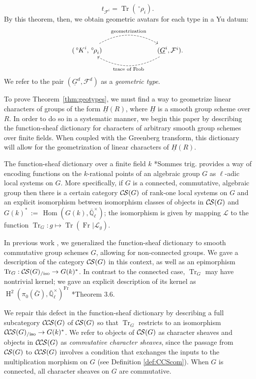 \documentclass[10pt]{amsart}
\theoremstyle{plain}
\theoremstyle{definition}
\newcommand{\EE}{\mathbb{\bar Q}_\ell}
\newcommand{\EEx}{\EE^\times}
\newcommand{\Frob}[1]{\operatorname{Fr}_{#1}}
\DeclareMathOperator{\Hom}{Hom}
\DeclareMathOperator{\Hh}{H}
\DeclareMathOperator{\trace}{Tr}
\newcommand{\ceq}{{\, :=\, }}
\newcommand{\trFrob}[1]{t_{#1}}
\DeclareMathOperator{\Tr}{Tr}
\newcommand{\TrFrob}[1]{\Tr_{#1}}
\newcommand{\cs}[1]{{\mathcal{#1}}}
\newcommand{\CS}{{\mathcal{C\hskip-0.8pt S}}}
\newcommand{\CCS}{{\mathcal{C\hskip-.8pt C\hskip-0.8pt S}}}
\newcommand{\CSiso}[1]{\CS(#1)_{/\text{iso}}}
\newcommand{\CCSiso}[1]{\CCS(#1)_{/\text{iso}}}
\newcommand{\bG}{\bar{G}}
\newcommand{\oK}{{\,^\circ \hskip-1pt K}}
\newcommand{\orho}{{\,^\circ \hskip-1pt \rho}}
\begin{document}
\begin{equation}\label{eqn:intro1}
\trFrob{\cs{F}^i} = \trace(\,^\circ\rho_i).
\end{equation}
By this theorem, then, we obtain geometric avatars for each type in a Yu datum:
\[
\begin{tikzcd}
(\oK^i,\orho_i) \arrow[bend left, dashed]{rrr}{\text{geometrization}} &&& \arrow[bend left, dashed]{lll}{\text{trace of Frob}}
(\underline{G}^i, \cs{F}^i).
\end{tikzcd}
\]
We refer to the pair $(\underline{G}^d, \cs{F}^d)$ as a \emph{geometric type}.

To prove Theorem~\ref{thm:geotypes}, we must find a way to geometrize linear characters of groups of the form $\underline{H}(R)$, where $\underline{H}$ is a smooth group scheme over $R$. 
In order to do so in a systematic manner, we begin this paper by describing the function-sheaf dictionary for characters of arbitrary smooth group schemes over finite fields. 
When coupled with the Greenberg transform, this dictionary will allow for the geometrization of linear characters of $\underline{H}(R)$.

The function-sheaf dictionary over a finite field $k$ \cite{deligne:SGA4.5}*{Sommes trig.}
provides a way of encoding functions on the $k$-rational points of an algebraic group $G$
as $\ell$-adic local systems on $G$.  More specifically, if $G$ is a connected, commutative, algebraic group
then there is a certain category $\CS(G)$ of rank-one local systems on $G$ and an
explicit isomorphism between isomorphism classes
of objects in $\CS(G)$ and $G(k)^* \ceq \Hom(G(k), \EEx)$; 
the isomorphism is given by mapping $\cs{L}$ to the function
$\TrFrob{G} : g \mapsto \Tr(\Frob{} \vert \cs{L}_g)$.

In previous work \cite{cunningham-roe:13a}, we generalized the function-sheaf dictionary to
smooth commutative group schemes $G$, allowing for non-connected groups.
We gave a description of the category $\CS(G)$ in this context, as well
as an epimorphism $\TrFrob{G} : \CSiso{G} \to G(k)^*$.
In contrast to the connected case, $\TrFrob{G}$ may have nontrivial kernel;
we gave an explicit description of its kernel as $\Hh^2(\pi_0(\bG), \EEx)^{\Frob{}}$ \cite{cunningham-roe:13a}*{Theorem 3.6}.  

We repair this defect in the function-sheaf dictionary
 by describing a full subcategory $\CCS(G)$ of $\CS(G)$ so that $\TrFrob{G}$ restricts to an isomorphism $\CCSiso{G} \to G(k)^*$.
We refer to objects of $\CS(G)$ as character sheaves and objects in $\CCS(G)$ as \emph{commutative character sheaves}, since the passage from $\CS(G)$ to $\CCS(G)$ involves a condition that exchanges the inputs to the multiplication morphism on $G$ (see Definition \ref{def:CCScom}).  
When $G$ is connected, all character sheaves on $G$ are commutative.
\end{document}
